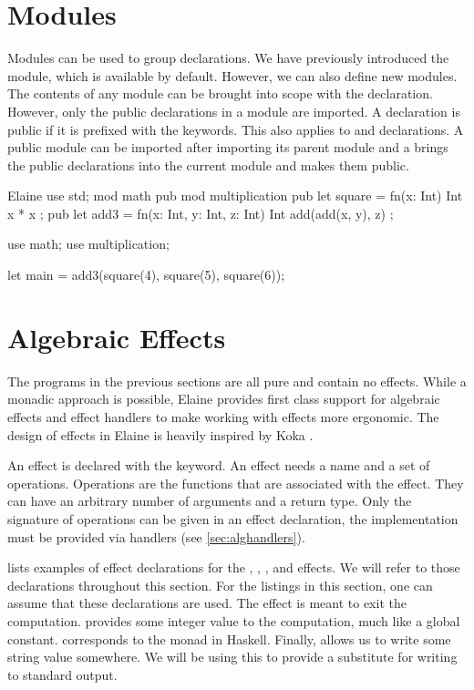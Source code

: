 \section{Modules}

Modules can be used to group declarations. We have previously introduced the  module, which is available by default. However, we can also define new modules. The contents of any module can be brought into scope with the  declaration. However, only the public declarations in a module are imported. A declaration is public if it is prefixed with the  keywords. This also applies to  and  declarations. A public module can be imported after importing its parent module and a  brings the public declarations into the current module and makes them public.

\begin{lst}{Elaine}
use std;
mod math {
    pub mod multiplication {
        pub let square = fn(x: Int) Int { x * x };
    }
    pub let add3 = fn(x: Int, y: Int, z: Int) Int {
        add(add(x, y), z)
    };
}

use math;
use multiplication;

let main = add3(square(4), square(5), square(6));
\end{lst}

\section{Algebraic Effects}

The programs in the previous sections are all pure and contain no effects. While a monadic approach is possible, Elaine provides first class support for algebraic effects and effect handlers to make working with effects more ergonomic. The design of effects in Elaine is heavily inspired by Koka \autocite{leijen_koka_2014}.

An effect is declared with the  keyword. An effect needs a name and a set of operations. Operations are the functions that are associated with the effect. They can have an arbitrary number of arguments and a return type. Only the signature of operations can be given in an effect declaration, the implementation must be provided via handlers (see \cref{sec:alghandlers}).

 lists examples of effect declarations for the , , , and  effects. We will refer to those declarations throughout this section. For the listings in this section, one can assume that these declarations are used. The  effect is meant to exit the computation.  provides some integer value to the computation, much like a global constant.  corresponds to the  monad in Haskell. Finally,  allows us to write some string value somewhere. We will be using this to provide a substitute for writing to standard output.

